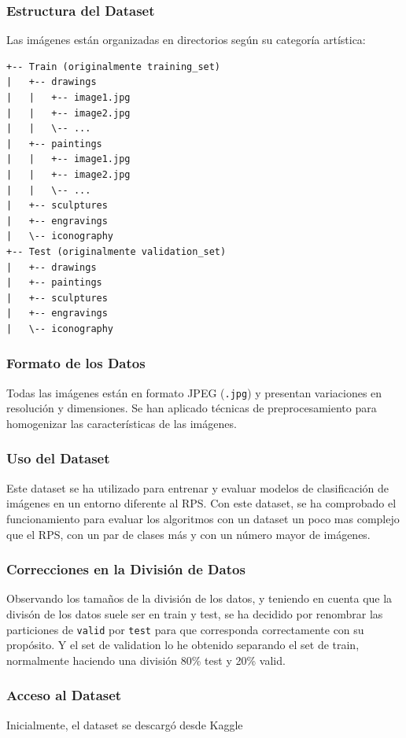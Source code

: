 \subsubsection{Estructura del Dataset}
Las imágenes están organizadas en directorios según su categoría artística:
\begin{verbatim}
+-- Train (originalmente training_set)
|   +-- drawings
|   |   +-- image1.jpg
|   |   +-- image2.jpg
|   |   \-- ...
|   +-- paintings
|   |   +-- image1.jpg
|   |   +-- image2.jpg
|   |   \-- ...
|   +-- sculptures
|   +-- engravings
|   \-- iconography
+-- Test (originalmente validation_set)
|   +-- drawings
|   +-- paintings
|   +-- sculptures
|   +-- engravings
|   \-- iconography
\end{verbatim}

\subsubsection{Formato de los Datos}
Todas las imágenes están en formato JPEG (\texttt{.jpg}) y presentan variaciones en resolución y dimensiones.
Se han aplicado técnicas de preprocesamiento para homogenizar las características de las imágenes.

\subsubsection{Uso del Dataset}
Este dataset se ha utilizado para entrenar y evaluar modelos de clasificación de imágenes en un entorno diferente al
RPS\@.
Con este dataset, se ha comprobado el funcionamiento para evaluar los algoritmos con un dataset un poco mas complejo
que el RPS, con un par de clases más y con un número mayor de imágenes.

\subsubsection{Correcciones en la División de Datos}
Observando los tamaños de la división de los datos, y teniendo en cuenta que la divisón de los datos suele ser en train
y test, se ha decidido por renombrar las particiones de \texttt{valid} por \texttt{test} para que corresponda
correctamente con su propósito.
Y el set de validation lo he obtenido separando el set de train, normalmente haciendo una división 80\% test y 20\%
valid.

\subsubsection{Acceso al Dataset}
Inicialmente, el dataset se descargó desde Kaggle~\cite{OriginalArtImages}

